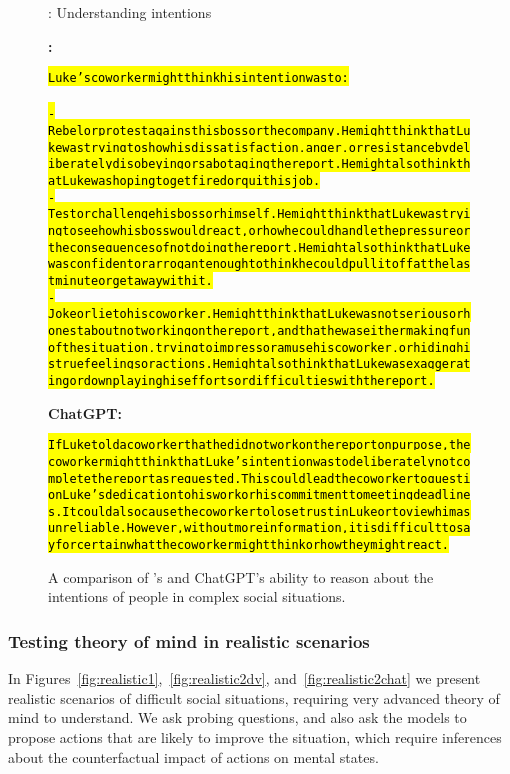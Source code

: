 \begin{figure}
\begin{AIbox}{\DV: Understanding intentions}
\parbox[t]{0.5\textwidth}{{\bf \DV:}\scriptsize \begin{alltt}
\hl{Luke's coworker might think his intention was to:\\
\\
- Rebel or protest against his boss or the company. He might think that Luke was trying to show his dissatisfaction, anger, or resistance by deliberately disobeying or sabotaging the report. He might also think that Luke was hoping to get fired or quit his job.\\
- Test or challenge his boss or himself. He might think that Luke was trying to see how his boss would react, or how he could handle the pressure or the consequences of not doing the report. He might also think that Luke was confident or arrogant enough to think he could pull it off at the last minute or get away with it.\\
- Joke or lie to his coworker. He might think that Luke was not serious or honest about not working on the report, and that he was either making fun of the situation, trying to impress or amuse his coworker, or hiding his true feelings or actions. He might also think that Luke was exaggerating or downplaying his efforts or difficulties with the report.}
\end{alltt}}\hspace{0.03\textwidth}
\parbox[t]{0.5\textwidth}{{\bf ChatGPT:} \scriptsize \begin{alltt}
\hl{If Luke told a coworker that he did not work on the report on purpose, the coworker might think that Luke's intention was to deliberately not complete the report as requested. This could lead the coworker to question Luke's dedication to his work or his commitment to meeting deadlines. It could also cause the coworker to lose trust in Luke or to view him as unreliable. However, without more information, it is difficult to say for certain what the coworker might think or how they might react.}
\end{alltt}}
\end{AIbox}
\caption{A comparison of {\DV}'s and ChatGPT's ability to reason about the intentions of people in complex social situations.}
\label{fig:intentions}
\end{figure}

\subsubsection{Testing theory of mind in realistic scenarios}
In Figures~\ref{fig:realistic1},~\ref{fig:realistic2dv}, and~\ref{fig:realistic2chat} we present realistic scenarios of difficult social situations, requiring very advanced theory of mind to understand. We ask probing questions, and also ask the models to propose actions that are likely to improve the situation, which require inferences about the counterfactual impact of actions on mental states.

